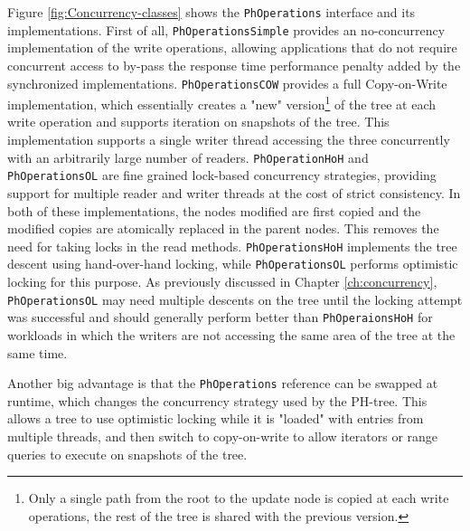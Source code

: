 \documentclass[11pt,a4paper]{globis-book}
\begin{document}
Figure \ref{fig:Concurrency-classes} shows the \texttt{PhOperations} interface and its implementations. First of all, \texttt{PhOperationsSimple} provides an no-concurrency implementation of the write operations, allowing applications that do not require concurrent access to by-pass the response time performance penalty added by the synchronized implementations. \texttt{PhOperationsCOW} provides a full Copy-on-Write implementation, which essentially creates a "new" version\footnote{Only a single path from the root to the update node is copied at each write operations, the rest of the tree is shared with the previous version.} of the tree at each write operation and supports iteration on snapshots of the tree. This implementation supports a single writer thread accessing the three concurrently with an arbitrarily large number of readers. \texttt{PhOperationHoH} and \texttt{PhOperationsOL} are fine grained lock-based concurrency strategies, providing support for multiple reader and writer threads at the cost of strict consistency. In both of these implementations, the nodes modified are first copied and the modified copies are atomically replaced in the parent nodes. This removes the need for taking locks in the read methods. \texttt{PhOperationsHoH} implements the tree descent using hand-over-hand locking, while \texttt{PhOperationsOL} performs optimistic locking for this purpose. As previously discussed in Chapter \ref{ch:concurrency}, \texttt{PhOperationsOL} may need multiple descents on the tree until the locking attempt was successful and should generally perform better than \texttt{PhOperaionsHoH} for workloads in which the writers are not accessing the same area of the tree at the same time.

Another big advantage is that the \texttt{PhOperations} reference can be swapped at runtime, which changes the concurrency strategy used by the PH-tree. This allows a tree to use optimistic locking while it is "loaded" with entries from multiple threads, and then switch to copy-on-write to allow iterators or range queries to execute on snapshots of the tree. 
\end{document}
